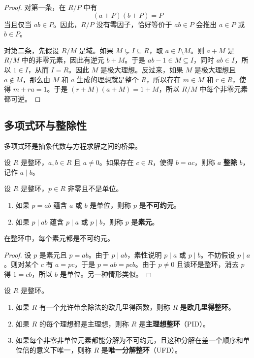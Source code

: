 \begin{proof}
对第一条，在 $R/P$ 中有
\[
    (a+P)(b+P)=P
\]
当且仅当 $ab\in P$。因此，$R/P$ 没有零因子，恰好等价于 $ab\in P$ 会推出 $a\in P$ 或 $b\in P$。

对第二条，先假设 $R/M$ 是域。如果 $M\subsetneq I\subseteq R$，取 $a\in I\setminus M$。则 $a+M$ 是 $R/M$ 中的非零元素，因此有逆元 $b+M$。于是 $ab-1\in M\subseteq I$，同时 $ab\in I$，所以 $1\in I$，从而 $I=R$。因此 $M$ 是极大理想。反过来，如果 $M$ 是极大理想且 $a\notin M$，那么由 $M$ 和 $a$ 生成的理想就是整个 $R$，所以存在 $m\in M$ 和 $r\in R$，使得 $m+ra=1$。于是 $(r+M)(a+M)=1+M$，所以 $R/M$ 中每个非零元素都可逆。
\end{proof}

\subsection{多项式环与整除性}

多项式环是抽象代数与方程求解之间的桥梁。

\begin{definition}[整除性]
设 $R$ 是整环，$a,b\in R$ 且 $a\neq 0$。如果存在 $c\in R$，使得 $b=ac$，则称 $a$ \textbf{整除} $b$，记作 $a\mid b$。
\end{definition}

\begin{definition}[不可约元与素元]
设 $R$ 是整环，$p\in R$ 非零且不是单位。
\begin{enumerate}
    \item 如果 $p=ab$ 蕴含 $a$ 或 $b$ 是单位，则称 $p$ 是\textbf{不可约元}。
    \item 如果 $p\mid ab$ 蕴含 $p\mid a$ 或 $p\mid b$，则称 $p$ 是\textbf{素元}。
\end{enumerate}
\end{definition}

\begin{proposition}
在整环中，每个素元都是不可约元。
\end{proposition}

\begin{proof}
设 $p$ 是素元且 $p=ab$。由于 $p\mid ab$，素性说明 $p\mid a$ 或 $p\mid b$。不妨假设 $p\mid a$。则对某个 $c$ 有 $a=pc$，于是 $p=ab=pcb$。由于 $p\neq 0$ 且该环是整环，消去 $p$ 得 $1=cb$，所以 $b$ 是单位。另一种情形类似。
\end{proof}

\begin{definition}
设 $R$ 是整环。
\begin{enumerate}
    \item 如果 $R$ 有一个允许带余除法的欧几里得函数，则称 $R$ 是\textbf{欧几里得整环}。
    \item 如果 $R$ 的每个理想都是主理想，则称 $R$ 是\textbf{主理想整环}（PID）。
    \item 如果每个非零非单位元素都能分解为不可约元，且这种分解在差一个顺序和单位倍的意义下唯一，则称 $R$ 是\textbf{唯一分解整环}（UFD）。
\end{enumerate}
\end{definition}

